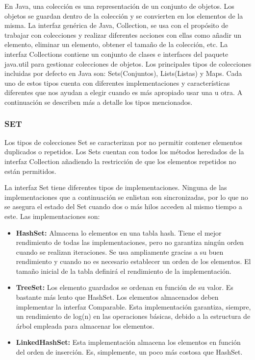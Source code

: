 \documentclass[12pt, letterpaper]{report}
\begin{document}
En Java, una colección es una representación de un conjunto de objetos. Los objetos se guardan dentro de la colección y se convierten en los elementos de la misma. La interfaz genérica de Java, Collection, se usa con el propósito de trabajar con colecciones y realizar diferentes acciones con ellas como añadir un elemento, eliminar un elemento, obtener el tamaño de la colección, etc. La interfaz Collections contiene un conjunto de clases e interfaces del paquete java.util para gestionar colecciones de objetos.
Los principales tipos de colecciones incluidas por defecto en Java son: Sets(Conjuntos), Lists(Listas) y Maps. Cada uno de estos tipos cuenta con diferentes implementaciones y características diferentes que nos ayudan a elegir cuando es más apropiado usar una u otra. A continuación se describen más a detalle los tipos mencionados.

\subsubsection*{SET}

Los tipos de colecciones Set se caracterizan por no permitir contener elementos duplicados o repetidos. Los Sets cuentan con todos los métodos heredados de la interfaz Collection añadiendo la restricción de que los elementos repetidos no están permitidos. 

La interfaz Set tiene diferentes tipos de implementaciones. Ninguna de las implementaciones que a continuación se enlistan son sincronizadas, por lo que no se asegura el estado del Set cuando dos o más hilos acceden al mismo tiempo a este. Las implementaciones son:

\begin{itemize}
  \item \textbf{HashSet:} Almacena lo elementos en una tabla hash. Tiene el mejor rendimiento de todas las implementaciones, pero no garantiza ningún orden cuando se realizan iteraciones. Se usa ampliamente gracias a su buen rendimiento y cuando no es necesario establecer un orden de los elementos. El tamaño inicial de la tabla definirá el rendimiento de la implementación.
  \item \textbf{TreeSet:} Los elemento guardados se ordenan en función de su valor. Es bastante más lento que HashSet. Los elementos almacenados deben implementar la interfaz Comparable. Esta implementación garantiza, siempre, un rendimiento de log(n) en las operaciones básicas, debido a la estructura de árbol empleada para almacenar los elementos.
  \item \textbf{LinkedHashSet:} Esta implementación almacena los elementos en función del orden de inserción. Es, simplemente, un poco más costosa que HashSet.
\end{itemize}
\end{document}
